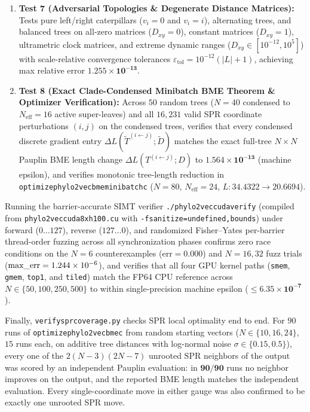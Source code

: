 \documentclass[11pt,a4paper]{article}
\makeatletter
\DeclareRobustCommand{\_}{\ifmmode\nfss@text{\textunderscore}\else\textunderscore\allowbreak\fi}
\theoremstyle{definition}
\makeatother
\begin{document}
\begin{enumerate}
    \item \textbf{Test 7 (Adversarial Topologies \& Degenerate Distance Matrices):} Tests pure left/right caterpillars ($v_i = 0$ and $v_i = i$), alternating trees, and balanced trees on all-zero matrices ($D_{xy} = 0$), constant matrices ($D_{xy} = 1$), ultrametric clock matrices, and extreme dynamic ranges ($D_{xy} \in [10^{-12}, 10^5]$) with scale-relative convergence tolerances $\varepsilon_{\text{tol}} = 10^{-12}(|L| + 1)$, achieving max relative error $\mathbf{1.255 \times 10^{-13}}$.
    \item \textbf{Test 8 (Exact Clade-Condensed Minibatch BME Theorem \& Optimizer Verification):} Across $50$ random trees ($N = 40$ condensed to $N_{\text{eff}} = 16$ active super-leaves) and all $16{,}231$ valid SPR coordinate perturbations $(i, j)$ on the condensed trees, verifies that every condensed discrete gradient entry $\Delta L(\widetilde{T}^{(i \leftarrow j)}; \widetilde{D})$ matches the exact full-tree $N \times N$ Pauplin BME length change $\Delta L(T^{(i \leftarrow j)}; D)$ to $\mathbf{1.564 \times 10^{-13}}$ (machine epsilon), and verifies monotonic tree-length reduction in \texttt{optimize\_phylo2vec\_bme\_minibatch\_c} ($N = 80$, $N_{\text{eff}} = 24$, $L: 34.4322 \to 20.6694$).
\end{enumerate}

Running the barrier-accurate SIMT verifier \texttt{./phylo2vec\_cuda\_verify} (compiled from \texttt{phylo2vec\_cuda\_8xh100.cu} with \texttt{-fsanitize=undefined,bounds}) under forward ($0 \dots 127$), reverse ($127 \dots 0$), and randomized Fisher--Yates per-barrier thread-order fuzzing across all synchronization phases confirms zero race conditions on the $N=6$ counterexamples ($\text{err} = 0.000$) and $N=16, 32$ fuzz trials ($\text{max\_err} = 1.244 \times 10^{-6}$), and verifies that all four GPU kernel paths (\texttt{smem}, \texttt{gmem}, \texttt{top1}, and \texttt{tiled}) match the FP64 CPU reference across $N \in \{50, 100, 250, 500\}$ to within single-precision machine epsilon ($\le \mathbf{6.35 \times 10^{-7}}$).

Finally, \texttt{verify\_spr\_coverage.py} checks SPR local optimality end to end. For $90$ runs of \texttt{optimize\_phylo2vec\_bme\_c} from random starting vectors ($N \in \{10, 16, 24\}$, $15$ runs each, on additive tree distances with log-normal noise $\sigma \in \{0.15, 0.5\}$), every one of the $2(N-3)(2N-7)$ unrooted SPR neighbors of the output was scored by an independent Pauplin evaluation: in $\mathbf{90 / 90}$ runs no neighbor improves on the output, and the reported BME length matches the independent evaluation. Every single-coordinate move in either gauge was also confirmed to be exactly one unrooted SPR move.
\end{document}
